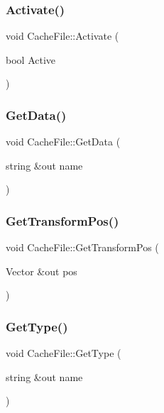 \subsubsection{\texorpdfstring{Activate()}{Activate()}}
{\footnotesize\ttfamily void Cache\+File\+::\+Activate (\begin{DoxyParamCaption}\item[{bool}]{Active }\end{DoxyParamCaption})}

\hypertarget{class_cache_file_a1f7e966e43bd4d510c6c769d04ca4d22}{}\label{class_cache_file_a1f7e966e43bd4d510c6c769d04ca4d22} 
\subsubsection{\texorpdfstring{Get\+Data()}{GetData()}}
{\footnotesize\ttfamily void Cache\+File\+::\+Get\+Data (\begin{DoxyParamCaption}\item[{string \&out}]{name }\end{DoxyParamCaption})}

\hypertarget{class_cache_file_a1fc0844ecf5973618fa0d3c26f0a28a0}{}\label{class_cache_file_a1fc0844ecf5973618fa0d3c26f0a28a0} 
\subsubsection{\texorpdfstring{Get\+Transform\+Pos()}{GetTransformPos()}}
{\footnotesize\ttfamily void Cache\+File\+::\+Get\+Transform\+Pos (\begin{DoxyParamCaption}\item[{Vector \&out}]{pos }\end{DoxyParamCaption})}

\hypertarget{class_cache_file_a3873c52b039643de0b9501f64cacac62}{}\label{class_cache_file_a3873c52b039643de0b9501f64cacac62} 
\subsubsection{\texorpdfstring{Get\+Type()}{GetType()}}
{\footnotesize\ttfamily void Cache\+File\+::\+Get\+Type (\begin{DoxyParamCaption}\item[{string \&out}]{name }\end{DoxyParamCaption})}

